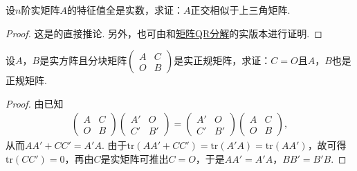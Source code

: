\documentclass[../../main.tex]{subfiles}%
\begin{document}
\begin{proposition}\label{proposition:两个半正定阵可同时合同对角化8}
设\(n\)阶实矩阵\(A\)的特征值全是实数，求证：\(A\)正交相似于上三角矩阵.
\end{proposition}
\begin{proof}

这是的直接推论. 另外，也可由和\hyperref[theorem:施密特正交化对应的矩阵分解,QR分解]{矩阵QR分解}的实版本进行证明.

\end{proof}

\begin{proposition}\label{proposition:两个半正定阵可同时合同对角化9}
设\(A\)，\(B\)是实方阵且分块矩阵\(\begin{pmatrix}A&C\\O&B\end{pmatrix}\)是实正规矩阵，求证：\(C = O\)且\(A\)，\(B\)也是正规矩阵.
\end{proposition}
\begin{proof}

由已知
\begin{align*}
\begin{pmatrix}A&C\\O&B\end{pmatrix}\begin{pmatrix}A'&O\\C'&B'\end{pmatrix}=\begin{pmatrix}A'&O\\C'&B'\end{pmatrix}\begin{pmatrix}A&C\\O&B\end{pmatrix},
\end{align*}
从而\(AA'+CC' = A'A\). 由于\(\mathrm{tr}(AA'+CC')=\mathrm{tr}(A'A)=\mathrm{tr}(AA')\)，故可得\(\mathrm{tr}(CC') = 0\)，再由\(C\)是实矩阵可推出\(C = O\)，于是\(AA' = A'A\)，\(BB' = B'B\).

\end{proof}
\end{document}

